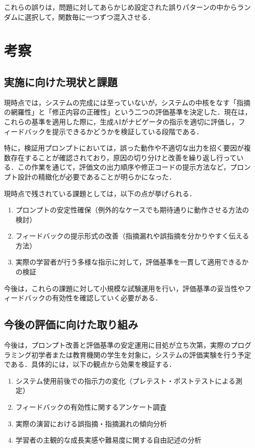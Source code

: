 \documentclass[twoside,twocolumn,10pt]{jsarticle}
\begin{document}
これらの誤りは，問題に対してあらかじめ設定された誤りパターンの中からランダムに選択して，関数毎に一つずつ混入させる．

\section{考察}\label{考察}

\subsection{実施に向けた現状と課題}
現時点では，システムの完成には至っていないが，システムの中核をなす「指摘の網羅性」と「修正内容の正確性」という二つの評価基準を決定した．現在は，これらの基準を適用した際に，生成AIがナビゲータの指示を適切に評価し，フィードバックを提示できるかどうかを検証している段階である．

特に，検証用プロンプトにおいては，誤った動作や不適切な出力を招く要因が複数存在することが確認されており，原因の切り分けと改善を繰り返し行っている．この作業を通じて，評価文の出力順序や修正コードの提示方法など，プロンプト設計の精緻化が必要であることが明らかになった．

現時点で残されている課題としては，以下の点が挙げられる．

\begin{enumerate}
    \item プロンプトの安定性確保（例外的なケースでも期待通りに動作させる方法の検討）
    \item フィードバックの提示形式の改善（指摘漏れや誤指摘を分かりやすく伝える方法）
    \item 実際の学習者が行う多様な指示に対して，評価基準を一貫して適用できるかの検証
\end{enumerate}

今後は，これらの課題に対して小規模な試験運用を行い，評価基準の妥当性やフィードバックの有効性を確認していく必要がある．

\subsection{今後の評価に向けた取り組み}
今後は，プロンプト改善と評価基準の安定運用に目処が立ち次第，実際のプログラミング初学者または教育機関の学生を対象に，システムの評価実験を行う予定である．具体的には，以下の観点から効果を検証する．

\begin{enumerate}
    \item システム使用前後での指示力の変化（プレテスト・ポストテストによる測定）
    \item フィードバックの有効性に関するアンケート調査
    \item 実際の演習における誤指摘・指摘漏れの傾向分析
    \item 学習者の主観的な成長実感や難易度に関する自由記述の分析
\end{enumerate}
\end{document}
